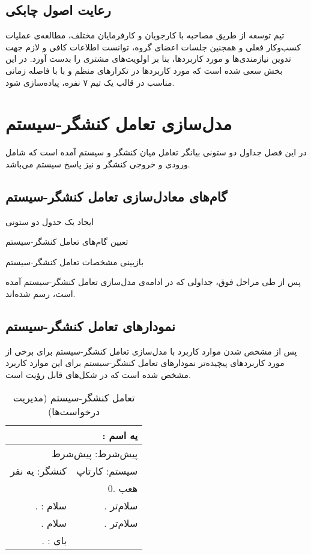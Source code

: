 \documentclass[12pt,svgnames,oneside]{book}
\newcounter{itemadded}
\let\LaTeXStandardEnumerateBegin\enumerate
\let\LaTeXStandardEnumerateEnd\endenumerate
\renewenvironment{enumerate}{%
\LaTeXStandardEnumerateBegin%
\setcounter{itemadded}{0}
}{%
\LaTeXStandardEnumerateEnd%
}%
\newcommand{\uc}[1]{\lr{U{#1}}}
\newcommand{\tucbw}{\lr{TUCBW}}
\newcommand{\tucew}{\lr{TUCEW}}
\newcommand{\actorsystem}[1]{
کنشگر: {#1} &
سیستم: کارتاپ \\
}
\newcommand{\zerostep}[1]{
& 0. {#1} \\
}
\newcounter{UseCaseCounter}
\newcommand{\step}[1]{
\stepcounter{UseCaseCounter}\arabic{UseCaseCounter}. {#1}
}
\newcommand{\ucname}[2]{
\multicolumn{2}{|r|}{\uc{0{#1}}: {#2}} \\
}
\newcommand{\preif}[1]{
\multicolumn{2}{|r|}{پیش‌شرط:‌ {#1}} \\
}
\begin{document}
\section{رعایت اصول چابکی}
تیم توسعه از طریق مصاحبه با کارجویان و کارفرمایان مختلف، مطالعه‌ی عملیات کسب‌وکار فعلی و همجنین جلسات اعضای گروه، توانست اطلاعات کافی و لازم جهت تدوین نیاز‌مندی‌ها و مورد کاربر‌د‌ها، بنا بر اولویت‌های مشتری را بدست آورد. در این بخش سعی شده است که مورد کاربرد‌ها در تکرار‌های منظم و با با فاصله زمانی مناسب در قالب یک تیم ۷ نفره، پیاده‌سازی شود.

\chapter{مدل‌سازی تعامل کنشگر-سیستم}
در این فصل جداول دو‌ ستونی بیانگر تعامل میان کنشگر و سیستم آمده است که شامل ورودی و خروجی کنشگر و نیز پاسخ سیستم می‌باشد.


\section{گام‌های معادل‌سازی تعامل کنشگر-سیستم}
\begin{enumerate}
\item 
ایجاد یک حدول دو ستونی

\item 
تعیین گام‌های تعامل کنشگر-سیستم

\item 
بازبینی مشخصات تعامل کنشگر-سیستم
\end{enumerate}

پس از طی مراحل فوق، جداولی که در ادامه‌ی مدل‌سازی تعامل کنشگر-سیستم آمده‌ است، رسم شده‌اند.

\section{نمودار‌های تعامل کنشگر-سیستم}
پس از مشخص شدن موارد کاربرد با مدل‌سازی تعامل کنشگر-سیستم برای برخی از مورد‌ کاربرد‌های پیچیده‌تر نمودار‌های تعامل کنشگر-سیستم برای این موارد کاربرد مشخص شده است که در شکل‌های 
قابل رؤیت است.

\begin{table}[H]
\caption{تعامل کنشگر-سیستم  (مدیریت درخواست‌ها)}
\begin{center}
\begin{tabular}{|r|r|}
\hline

\ucname{n}{یه اسم}
\hline

\preif{پیش‌شرط}
\hline

\actorsystem{یه نفر}
\hline

\zerostep{هعب}
\hline

\step{\tucbw: سلام} & 
\step{سلام‌تر} \\
\hline

\step{سلام} & 
\step{سلام‌تر} \\
\hline

\step{\tucew: بای} & 
\\
\hline

\end{tabular}
\end{center}
\end{table}
\end{document}
